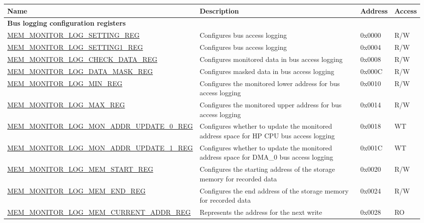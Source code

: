 \begin{longtable}{ | l | m{13cm} | l | l | }
\hline\rowcolor{lightgray}
{\bfseries Name} & {\bfseries Description} &  {\bfseries Address} & {\bfseries Access} \\ \hline
\endhead
\multicolumn{4}{|l|}{\textbf{Bus logging configuration registers}} \\ \hline
\hyperref[regdesc:MEMMONITORLOGSETTINGREG]{MEM\_MONITOR\_LOG\_SETTING\_REG} & Configures bus access logging  & 0x0000 & R/W \\ \hline
\hyperref[regdesc:MEMMONITORLOGSETTING1REG]{MEM\_MONITOR\_LOG\_SETTING1\_REG} & Configures bus access logging & 0x0004 & R/W \\ \hline
\hyperref[regdesc:MEMMONITORLOGCHECKDATAREG]{MEM\_MONITOR\_LOG\_CHECK\_DATA\_REG} & Configures monitored data in bus access logging & 0x0008 & R/W \\ \hline
\hyperref[regdesc:MEMMONITORLOGDATAMASKREG]{MEM\_MONITOR\_LOG\_DATA\_MASK\_REG} & Configures masked data in bus access logging & 0x000C & R/W \\ \hline
\hyperref[regdesc:MEMMONITORLOGMINREG]{MEM\_MONITOR\_LOG\_MIN\_REG} & Configures the monitored lower address for bus access logging & 0x0010 & R/W \\ \hline
\hyperref[regdesc:MEMMONITORLOGMAXREG]{MEM\_MONITOR\_LOG\_MAX\_REG} & Configures the monitored upper address for bus access logging & 0x0014 & R/W \\ \hline
\hyperref[regdesc:MEMMONITORLOGMONADDRUPDATE0REG]{MEM\_MONITOR\_LOG\_MON\_ADDR\_UPDATE\_0\_REG} & Configures whether to update the monitored address space for HP CPU bus access logging & 0x0018 & WT \\ \hline
\hyperref[regdesc:MEMMONITORLOGMONADDRUPDATE1REG]{MEM\_MONITOR\_LOG\_MON\_ADDR\_UPDATE\_1\_REG} & Configures whether to update the monitored address space for DMA\_0 bus access logging & 0x001C & WT \\ \hline
\hyperref[regdesc:MEMMONITORLOGMEMSTARTREG]{MEM\_MONITOR\_LOG\_MEM\_START\_REG} & Configures the starting address of the storage memory for recorded data & 0x0020 & R/W \\ \hline
\hyperref[regdesc:MEMMONITORLOGMEMENDREG]{MEM\_MONITOR\_LOG\_MEM\_END\_REG} & Configures the end address of the storage memory for recorded data & 0x0024 & R/W \\ \hline
\hyperref[regdesc:MEMMONITORLOGMEMCURRENTADDRREG]{MEM\_MONITOR\_LOG\_MEM\_CURRENT\_ADDR\_REG} & Represents the address for the next write & 0x0028 & RO \\ \hline

\end{longtable}
